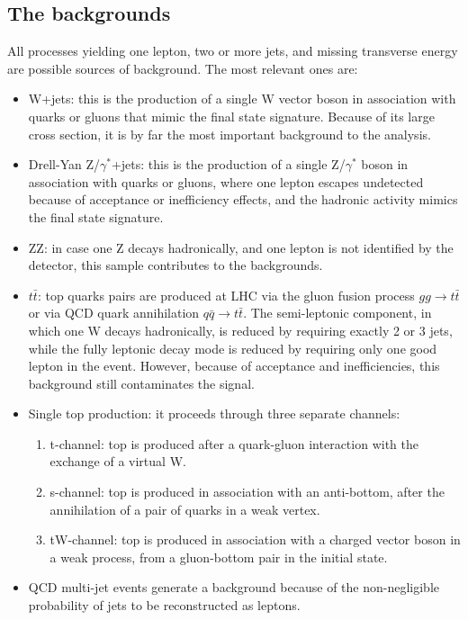 \subsection {The backgrounds}
All processes yielding one lepton, two or more jets, 
and missing transverse energy are possible sources 
of background. The most relevant ones are:
\begin{itemize}
  \item W+jets: this is the production of a single W vector boson 
        in association with quarks or gluons that mimic the final state 
        signature. 
        Because of its large cross section, it is by far the most important 
	background to the analysis.
  \item Drell-Yan Z/$\gamma^{*}$+jets: this is the production of 
        a single Z/$\gamma^{*}$ boson in association with quarks or gluons, 
	where one lepton escapes undetected because of acceptance or 
        inefficiency effects, and the hadronic activity mimics the final 
	 state signature.
  \item ZZ: in case one Z decays hadronically, and one lepton is not identified by the detector,
              this sample contributes to the backgrounds.
  \item $t\bar{t}$: top quarks pairs are produced at LHC via the gluon fusion process
              $gg\to{}t\bar{t}$ or via QCD quark annihilation $q\bar{q}\to{}t\bar{t}$.
              The semi-leptonic component, in which one W decays hadronically,
              is reduced by requiring exactly 2 or 3 jets,
              while the fully leptonic decay mode is reduced by requiring only 
	      one good lepton in the event.
              However, because of acceptance and inefficiencies, 
              this background still contaminates the signal.
  \item Single top production: it proceeds through three separate channels:
       \begin{enumerate}
         \item t-channel: top is produced after a quark-gluon interaction 
               with the exchange of a virtual W.
         \item s-channel: top is produced in association with an anti-bottom, 
               after the annihilation of a pair of quarks in a weak vertex.
         \item tW-channel: top is produced in association with a charged vector boson in a weak process, 
               from a gluon-bottom pair in the initial state.
       \end{enumerate}
  \item QCD multi-jet events generate a background 
       because of the non-negligible probability of jets to be reconstructed as leptons.
\end{itemize}

